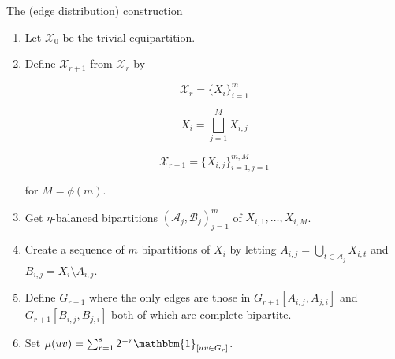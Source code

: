 \documentclass{beamer}
\newcommand{\1}{\mathbbm{1}}
\newcommand{\X}{\mathcal{X}}
\newcommand{\A}{\mathcal{A}}
\newcommand{\B}{\mathcal{B}}
\newcommand{\indicator}[1]{\1_{[#1]}}
\begin{document}
\begin{frame}{The (edge distribution) construction}
  \begin{enumerate}
    \item[] Let $\X_0$ be the trivial equipartition.
          \pause
    \item Define $\X_{r + 1}$ from $\X_r$ by
          \vspace{-25pt}
          \begin{multicols}{3}
            \begin{equation*}
              \X_r = \{ X_i \}_{i = 1}^m
            \end{equation*}

            \begin{equation*}
              X_i = \bigsqcup_{j = 1}^M X_{i, j}
            \end{equation*}

            \begin{equation*}
              \X_{r + 1} = \{ X_{i, j} \}_{i = 1, j = 1}^{m, M}
            \end{equation*}
          \end{multicols}
          for $M = \phi(m)$.

          \pause

    \item Get $\eta$-balanced bipartitions $(\A_j, \B_j)_{j = 1}^m$ of $X_{i, 1}, \dots,
            X_{i, M}$.

          \pause

    \item Create a sequence of $m$ bipartitions of $X_i$ by letting $A_{i, j} =
            \bigcup_{t \in \A_j} X_{i, t}$ and $B_{i, j} = X_i \setminus A_{i, j}$.

          \pause

    \item Define $G_{r + 1}$ where the only edges are those in
          $G_{r + 1}[A_{i, j}, A_{j, i}]$ and $G_{r + 1}[B_{i, j}, B_{j, i}]$ both of
          which are complete bipartite.
          \pause
    \item Set $\mu(uv) = \sum_{r = 1}^s 2^{-r} \indicator{uv \in G_r}$.
  \end{enumerate}

\end{frame}
\end{document}
